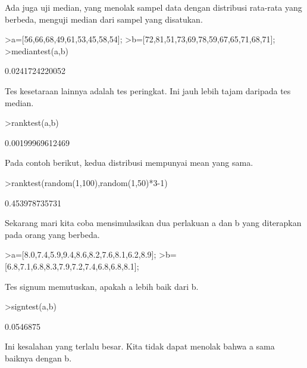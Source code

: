 \documentclass[a4paper,10pt]{article}
\begin{document}
\begin{eulernotebook}
\begin{eulercomment}
\begin{eulercomment}
\begin{eulercomment}
\begin{eulercomment}
\begin{eulercomment}
Ada juga uji median, yang menolak sampel data dengan distribusi
rata-rata yang berbeda, menguji median dari sampel yang disatukan.
\end{eulercomment}
\begin{eulerprompt}
>a=[56,66,68,49,61,53,45,58,54];
>b=[72,81,51,73,69,78,59,67,65,71,68,71];
>mediantest(a,b)
\end{eulerprompt}
\begin{euleroutput}
  0.0241724220052
\end{euleroutput}
\begin{eulercomment}
Tes kesetaraan lainnya adalah tes peringkat. Ini jauh lebih tajam
daripada tes median.
\end{eulercomment}
\begin{eulerprompt}
>ranktest(a,b)
\end{eulerprompt}
\begin{euleroutput}
  0.00199969612469
\end{euleroutput}
\begin{eulercomment}
Pada contoh berikut, kedua distribusi mempunyai mean yang sama.
\end{eulercomment}
\begin{eulerprompt}
>ranktest(random(1,100),random(1,50)*3-1)
\end{eulerprompt}
\begin{euleroutput}
  0.453978735731
\end{euleroutput}
\begin{eulercomment}
Sekarang mari kita coba mensimulasikan dua perlakuan a dan b yang
diterapkan pada orang yang berbeda.
\end{eulercomment}
\begin{eulerprompt}
>a=[8.0,7.4,5.9,9.4,8.6,8.2,7.6,8.1,6.2,8.9];
>b=[6.8,7.1,6.8,8.3,7.9,7.2,7.4,6.8,6.8,8.1];
\end{eulerprompt}
\begin{eulercomment}
Tes signum memutuskan, apakah a lebih baik dari b.
\end{eulercomment}
\begin{eulerprompt}
>signtest(a,b)
\end{eulerprompt}
\begin{euleroutput}
  0.0546875
\end{euleroutput}
\begin{eulercomment}
Ini kesalahan yang terlalu besar. Kita tidak dapat menolak bahwa a
sama baiknya dengan b.


\end{eulercomment}
\end{eulercomment}
\end{eulercomment}
\end{eulercomment}
\end{eulercomment}
\end{eulernotebook}
\end{document}

